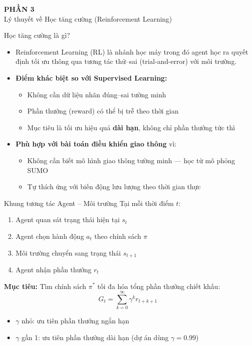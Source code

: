
\begin{frame}
  \centering
  \Huge \textbf{PHẦN 3} \\[0.5cm]
  \LARGE Lý thuyết về Học tăng cường (Reinforcement Learning)
\end{frame}

\begin{frame}{Học tăng cường là gì?}
\begin{itemize}
    \item Reinforcement Learning (RL) là nhánh học máy trong đó agent học ra quyết định tối ưu thông qua tương tác thử–sai (trial-and-error) với môi trường.
    \item \textbf{Điểm khác biệt so với Supervised Learning:}
    \begin{itemize}
        \item Không cần dữ liệu nhãn đúng–sai tường minh
        \item Phần thưởng (reward) có thể bị trễ theo thời gian
        \item Mục tiêu là tối ưu hiệu quả \textbf{dài hạn}, không chỉ phần thưởng tức thì
    \end{itemize}
    \item \textbf{Phù hợp với bài toán điều khiển giao thông} vì:
    \begin{itemize}
        \item Không cần biết mô hình giao thông tường minh — học từ mô phỏng SUMO
        \item Tự thích ứng với biến động lưu lượng theo thời gian thực
    \end{itemize}
\end{itemize}
\end{frame}

\begin{frame}{Khung tương tác Agent -- Môi trường}
Tại mỗi thời điểm $t$:
\begin{enumerate}
    \item Agent quan sát trạng thái hiện tại $s_t$
    \item Agent chọn hành động $a_t$ theo chính sách $\pi$
    \item Môi trường chuyển sang trạng thái $s_{t+1}$
    \item Agent nhận phần thưởng $r_t$
\end{enumerate}

\vspace{6pt}
\textbf{Mục tiêu:} Tìm chính sách $\pi^*$ tối đa hóa tổng phần thưởng chiết khấu:
\[
G_t = \sum_{k=0}^{\infty} \gamma^k r_{t+k+1}
\]

\begin{itemize}
    \item $\gamma$ nhỏ: ưu tiên phần thưởng ngắn hạn
    \item $\gamma$ gần 1: ưu tiên phần thưởng dài hạn (dự án dùng $\gamma = 0.99$)
\end{itemize}
\end{frame}

